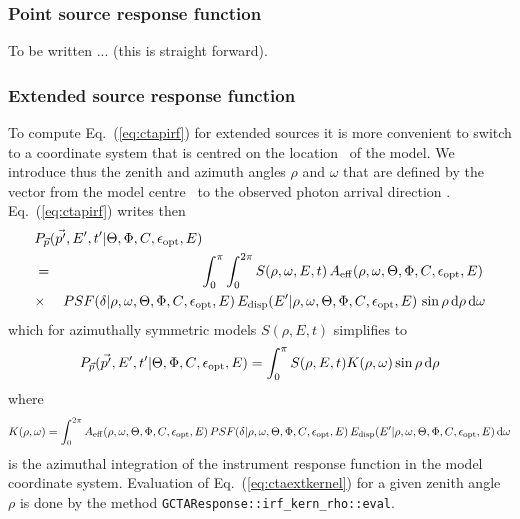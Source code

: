 \documentclass{article}[12pt,a4]
\begin{document}
\subsubsection{Point source response function}

To be written ... (this is straight forward).


\subsubsection{Extended source response function}

To compute Eq.~(\ref{eq:ctapirf}) for extended sources it is more convenient to switch to
a coordinate system that is centred on the location \mdir\ of the model.
We introduce thus the zenith and azimuth angles $\rho$ and $\omega$ that
are defined by the vector from the model centre \mdir\ to the observed photon arrival direction 
\phdir.
Eq.~(\ref{eq:ctapirf}) writes then
\begin{eqnarray}
\lefteqn{P_{\vec{p}}(\vec{p'}, E', t' | \zen, \azm, \conf, \opt, E)} & & \nonumber \\
& = & \int_0^{\pi} \int_0^{2 \pi} 
S(\rho, \omega, E, t) \, A_{\rm eff}(\rho, \omega, \zen, \azm, \conf, \opt, E) \, \nonumber \\
& \times &
PSF(\psfsep | \rho, \omega, \zen, \azm, \conf, \opt, E) \,
E_{\rm disp}(E' | \rho, \omega, \zen, \azm, \conf, \opt, E) \,
\sin \rho \, {\rm d}\rho \, {\rm d}\omega
\end{eqnarray}
which for azimuthally symmetric models $S(\rho, E, t)$ simplifies to
\begin{equation}
P_{\vec{p}}(\vec{p'}, E', t' | \mbox{$\Theta$}, \mbox{$\Phi$}, \mbox{$C$}, \mbox{$\epsilon_{\rm opt}$}, E) =
\int_0^{\pi} S(\rho, E, t) K(\rho, \omega) \sin \rho \, {\rm d}\rho
\label{eq:ctaextirf}
\end{equation}
where
\begin{equation}
K(\rho, \omega) = \int_0^{2 \pi} 
A_{\rm eff}(\rho, \omega, \mbox{$\Theta$}, \mbox{$\Phi$}, \mbox{$C$}, \mbox{$\epsilon_{\rm opt}$}, E) \,
PSF(\mbox{$\delta$} | \rho, \omega, \mbox{$\Theta$}, \mbox{$\Phi$}, \mbox{$C$}, \mbox{$\epsilon_{\rm opt}$}, E) \,
E_{\rm disp}(E' | \rho, \omega, \mbox{$\Theta$}, \mbox{$\Phi$}, \mbox{$C$}, \mbox{$\epsilon_{\rm opt}$}, E) \,
{\rm d}\omega
\label{eq:ctaextkernel}
\end{equation}
is the azimuthal integration of the instrument response function in the model coordinate
system.
Evaluation of Eq.~(\ref{eq:ctaextkernel}) for a given zenith angle $\rho$ is done by the method
{\tt GCTAResponse::irf\_kern\_rho::eval}.
\end{document}
